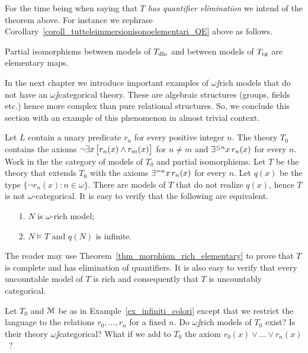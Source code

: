 \documentclass[creche.tex]{subfiles}
\begin{document}
For the time being when saying that \textit{$T$ has quantifier elimination\/} we intend  of the theorem above. For instance we rephrase Corollary~\ref{coroll_tutteleimmersionisonoelementari_QE} above as follows.

\begin{corollary}\label{coroll_tutteleimmersionisonoelementari_QE2}
Partial isomorphisms between models of $T_{\rm dlo}$ and between models of $T_{\rm rg}$ are elementary maps.\QED
\end{corollary}

In the next chapter we introduce important examples of $\omega\jj$rich models that do not have an $\omega\jj$categorical theory. These are algebraic structures (groups, fields etc.) hence more complex than pure relational structures. So, we conclude this section with an example of this phenomenon in almost trivial context. 

\begin{example}\label{ex_infiniti_colori}
Let $L$ contain a unary predicate $r_n$ for every positive integer $n$. The theory $T_0$ contains the axioms $\neg\exists x\, \big[r_n(x)\wedge r_m(x)\big]$ for $n\neq m$ and $\exists^{\le n}x\,r_n(x)$ for every $n$. Work in the the category of models of $T_0$ and partial isomorphisms. Let $T$ be the theory that extends $T_0$ with the axioms $\exists^{= n} x\, r_n(x)$ for every  $n$. Let $q(x)$ be the type $\big\{\neg r_n(x):n\in\omega\big\}$. There are models of $T$ that do not realize $q(x)$, hence $T$ is not $\omega$-categorical. It is easy to verify that the following are equivalent.
\begin{itemize}
 \item[1.] $N$ is $\omega$-rich model;
 \item[2.] $N\models T$ and  $q(N)$ is infinite.
\end{itemize}
The reader may use Theorem~\ref{thm_morphism_rich_elementary} to prove that $T$ is complete and has elimination of quantifiers. It is also easy to verify that every uncountable model of $T$ is rich and consequently that $T$ is uncountably categorical.\QED
\end{example}

\begin{exercise}\label{ex_finiti_colori}
Let $T_0$ and $\EuScript M$ be as in Example~\ref{ex_infiniti_colori} except that we restrict the language to the relations $r_0,\dots,r_n$ for a fixed $n$. Do $\omega\jj$rich models of $T_0$ exist? Is their theory $\omega\jj$categorical? What if we add to $T_0$ the axiom $r_0(x)\vee\dots\vee r_n(x)$~?\QED
\end{exercise}
\end{document}
